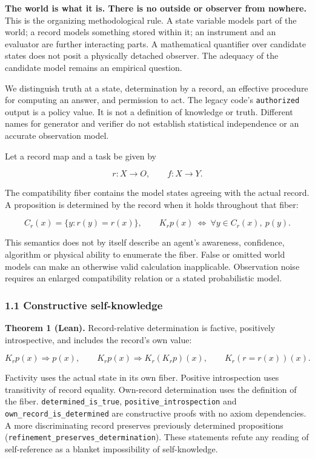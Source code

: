 \documentclass[
  10pt,
]{article}
\begin{document}
\textbf{The world is what it is. There is no outside or observer from nowhere.} This is the organizing methodological rule. A state variable models part of the world; a record models something stored within it; an instrument and an evaluator are further interacting parts. A mathematical quantifier over candidate states does not posit a physically detached observer. The adequacy of the candidate model remains an empirical question.

We distinguish truth at a state, determination by a record, an effective procedure for computing an answer, and permission to act. The legacy code's \texttt{authorized} output is a policy value. It is not a definition of knowledge or truth. Different names for generator and verifier do not establish statistical independence or an accurate observation model.

Let a record map and a task be given by

\protect\hypertarget{math-E0001-0001}{}{\[
r:X\to O,\qquad f:X\to Y.
\]}

The compatibility fiber contains the model states agreeing with the actual record. A proposition is determined by the record when it holds throughout that fiber:

\protect\hypertarget{math-E0002-0002}{}{\[
C_r(x)=\{y:r(y)=r(x)\},\qquad
K_r p(x)\ \Longleftrightarrow\ \forall y\in C_r(x),\ p(y).
\]}

This semantics does not by itself describe an agent's awareness, confidence, algorithm or physical ability to enumerate the fiber. False or omitted world models can make an otherwise valid calculation inapplicable. Observation noise requires an enlarged compatibility relation or a stated probabilistic model.

\subsubsection{1.1 Constructive self-knowledge}\label{constructive-self-knowledge}

\textbf{Theorem 1 (Lean).} Record-relative determination is factive, positively introspective, and includes the record's own value:

\protect\hypertarget{math-E0003-0003}{}{\[
K_r p(x)\Rightarrow p(x),\qquad
K_r p(x)\Rightarrow K_r(K_r p)(x),\qquad
K_r(r=r(x))(x).
\]}

Factivity uses the actual state in its own fiber. Positive introspection uses transitivity of record equality. Own-record determination uses the definition of the fiber. \texttt{determined\_is\_true}, \texttt{positive\_introspection} and \texttt{own\_record\_is\_determined} are constructive proofs with no axiom dependencies. A more discriminating record preserves previously determined propositions (\texttt{refinement\_preserves\_determination}). These statements refute any reading of self-reference as a blanket impossibility of self-knowledge.
\end{document}
